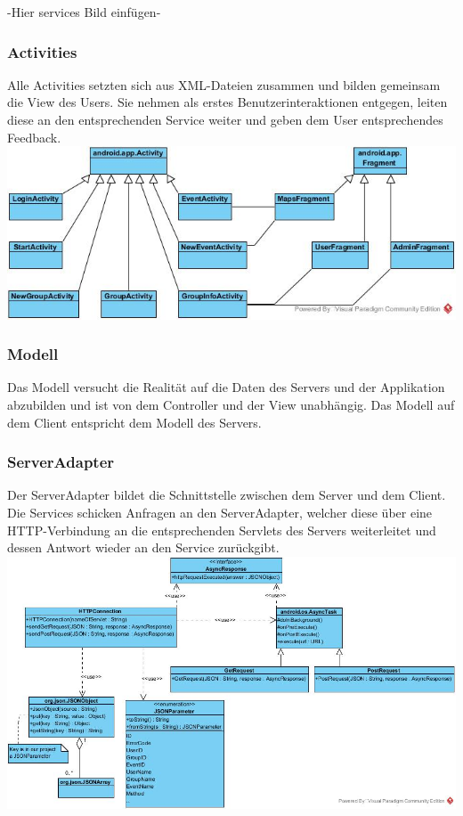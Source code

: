-Hier services Bild einfügen-

	\subsubsection{Activities}
	Alle Activities setzten sich aus XML-Dateien zusammen und bilden gemeinsam die View des Users.
Sie nehmen als erstes Benutzerinteraktionen entgegen, leiten diese an den entsprechenden Service weiter und geben dem User entsprechendes Feedback.
	\newline
	\includegraphics[width=1\textwidth]{ViewClassDiagram.jpg}
	
	\subsubsection{Modell}
Das Modell versucht die Realität auf die Daten des Servers und der Applikation abzubilden und ist von dem Controller und der View unabhängig. 
Das Modell auf dem Client entspricht dem Modell des Servers.
	\subsubsection{ServerAdapter}
	Der ServerAdapter bildet die Schnittstelle zwischen dem Server und dem Client. Die Services schicken Anfragen an den ServerAdapter, welcher diese über eine HTTP-Verbindung an die entsprechenden Servlets des Servers weiterleitet und dessen Antwort wieder an den Service zurückgibt.
		\newline
		\includegraphics[width=1\textwidth]{HTTPClientClass Diagram.jpg}

